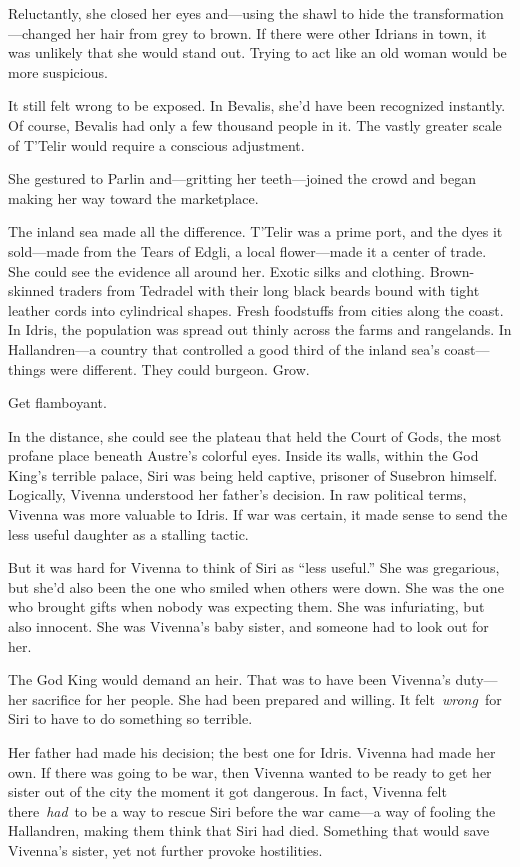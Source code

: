 Reluctantly, she closed her eyes and—using the shawl to hide the transformation—changed her hair from grey to brown. If there were other Idrians in town, it was unlikely that she would stand out. Trying to act like an old woman would be more suspicious.

It still felt wrong to be exposed. In Bevalis, she’d have been recognized instantly. Of course, Bevalis had only a few thousand people in it. The vastly greater scale of T’Telir would require a conscious adjustment.

She gestured to Parlin and—gritting her teeth—joined the crowd and began making her way toward the marketplace.

The inland sea made all the difference. T’Telir was a prime port, and the dyes it sold—made from the Tears of Edgli, a local flower—made it a center of trade. She could see the evidence all around her. Exotic silks and clothing. Brown-skinned traders from Tedradel with their long black beards bound with tight leather cords into cylindrical shapes. Fresh foodstuffs from cities along the coast. In Idris, the population was spread out thinly across the farms and rangelands. In Hallandren—a country that controlled a good third of the inland sea’s coast—things were different. They could burgeon. Grow.

Get flamboyant.

In the distance, she could see the plateau that held the Court of Gods, the most profane place beneath Austre’s colorful eyes. Inside its walls, within the God King’s terrible palace, Siri was being held captive, prisoner of Susebron himself. Logically, Vivenna understood her father’s decision. In raw political terms, Vivenna was more valuable to Idris. If war was certain, it made sense to send the less useful daughter as a stalling tactic.

But it was hard for Vivenna to think of Siri as “less useful.” She was gregarious, but she’d also been the one who smiled when others were down. She was the one who brought gifts when nobody was expecting them. She was infuriating, but also innocent. She was Vivenna’s baby sister, and someone had to look out for her.

The God King would demand an heir. That was to have been Vivenna’s duty—her sacrifice for her people. She had been prepared and willing. It felt~\textit{wrong}~for Siri to have to do something so terrible.

Her father had made his decision; the best one for Idris. Vivenna had made her own. If there was going to be war, then Vivenna wanted to be ready to get her sister out of the city the moment it got dangerous. In fact, Vivenna felt there~\textit{had}~to be a way to rescue Siri before the war came—a way of fooling the Hallandren, making them think that Siri had died. Something that would save Vivenna’s sister, yet not further provoke hostilities.

